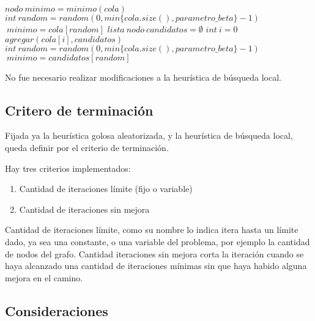 \begin{algorithmic}

    	 \State $nodo \: minimo = minimo(cola)$    
		\State $int \: random = random(0, min\{cola.size(), parametro\_beta\} -1)$
		\State $ \: minimo = cola[random]$
		\State $lista \: nodo \: candidatos = \emptyset$
		\State $int \: i = 0$
				\State $ agregar(cola[i], candidatos) $
			\EndIf
		\EndWhile
		\State $int \: random = random(0, min\{cola.size(), parametro\_beta\} -1)$
		\State $ \: minimo = candidatos[random]$
		\EndIf
		
\EndWhile
\end{algorithmic}

\vspace{2mm}

No fue necesario realizar modificaciones a la heur\'istica de b\'usqueda local.

\subsection{Critero de terminaci\'on}

Fijada ya la heur\'istica golosa aleatorizada, y la heur\'istica de b\'usqueda local, queda definir por el criterio de terminaci\'on.

\vspace{2mm}

Hay tres criterios implementados:

\begin{enumerate}
\item Cantidad de iteraciones l\'imite (fijo o variable)
\item Cantidad de iteraciones sin mejora
\end{enumerate}

Cantidad de iteraciones l\'imite, como su nombre lo indica itera hasta un l\'imite dado, ya sea una constante, o una variable del problema, por ejemplo la cantidad de nodos del grafo. Cantidad iteraciones sin mejora corta la iteraci\'on cuando se haya alcanzado una cantidad de iteraciones m\'inimas sin que haya habido alguna mejora en el camino.

\vspace{2mm}

\subsection{Consideraciones}

